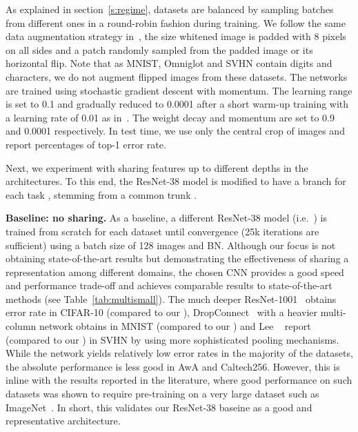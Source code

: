 \documentclass[10pt,twocolumn,letterpaper]{article}
\renewcommand{\paragraph}[1]{\par\medskip\noindent\textbf{#1}}
\begin{document}
As explained in section~\ref{s:regime}, datasets are balanced by sampling batches from different ones in a round-robin fashion during training. We follow the same data augmentation strategy in~\cite{he2016identity}, the  size whitened image is padded with 8 pixels on all sides and a  patch randomly sampled from the padded image or its horizontal flip. Note that as MNIST, Omniglot and SVHN contain digits and characters, we do not augment flipped images from these datasets. The networks are trained using stochastic gradient descent with momentum. The learning range is set to 0.1 and gradually reduced to 0.0001 after a short warm-up training with a learning rate of 0.01 as in~\cite{he2016identity}. The weight decay and momentum are set to 0.9 and 0.0001 respectively. In test time, we use only the central crop of images and report percentages of top-1 error rate.

Next, we experiment with sharing features up to different depths in the architectures. To this end, the ResNet-38 model  is modified to have a branch  for each task , stemming from a common trunk .

\paragraph{Baseline: no sharing.} As a baseline, a different ResNet-38 model (i.e.\ ) is trained from scratch for each dataset until convergence (25k iterations are sufficient) using a batch size of 128 images and BN. Although our focus is not obtaining state-of-the-art results but demonstrating the effectiveness of sharing a representation among different domains, the chosen CNN provides a good speed and performance trade-off and achieves comparable results to state-of-the-art methods (see Table~\ref{tab:multismall}). The much deeper ResNet-1001~\cite{he2016identity} obtains  error rate in CIFAR-10 (compared to our ), DropConnect~\cite{wan2013regularization} with a heavier multi-column network obtains  in MNIST (compared to our ) and Lee \etal~\cite{lee2016generalizing} report  (compared to our ) in SVHN by using more sophisticated pooling mechanisms. While the network yields relatively low error rates in the majority of the datasets, the absolute performance is less good in AwA and Caltech256. However, this is inline with the results reported in the literature, where good  performance on such datasets was shown to require pre-training on a very large dataset such as ImageNet~\cite{Donahue2013,zeiler14visualizing}. In short, this validates our ResNet-38 baseine as a good and representative architecture.
\end{document}
